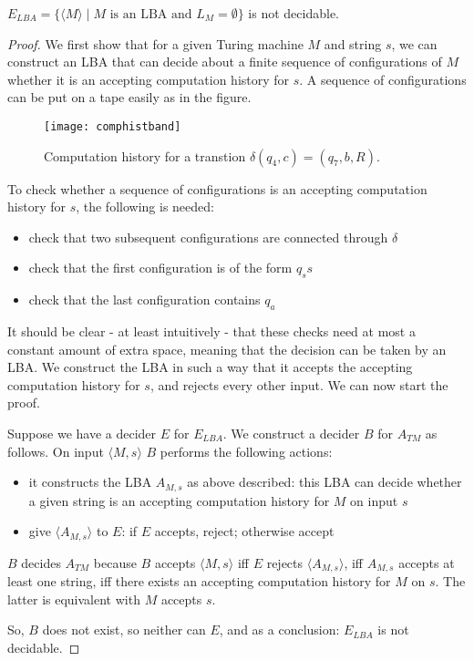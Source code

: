 \begin{theorem}
$E_{LBA} = \{\langle M\rangle \mid \text{$M$ is an LBA and $L_M = \emptyset$}\}$ is not decidable.
\end{theorem}
\begin{proof}
We first show that for a given Turing machine $M$ and string
$s$, we can construct an LBA that can decide about a finite sequence
of configurations of $M$ whether it is an accepting computation
history for $s$. A sequence of configurations can be put on a tape
easily as in the figure.
\begin{figure}
\centering
\texttt{[image: comphistband]}
  \caption{Computation history for a transtion $\delta(q_4,c) = (q_7,b,R)$.}
\end{figure}

To check whether a sequence of configurations is an accepting computation
history for $s$, the following is needed:
\begin{itemize}
\item check that two subsequent configurations are connected through
$\delta$
\item check that the first configuration is of the form $q_ss$
\item check that the last configuration contains $q_a$
\end{itemize}

It should be clear - at least intuitively - that these checks need at
most a constant amount of extra space, meaning that the decision can
be taken by an LBA. We construct the LBA in such a way that it accepts
the accepting computation history for $s$, and rejects every other
input.  We can now start the proof.

Suppose we have a decider $E$ for $E_{LBA}$. We construct a decider
$B$ for $A_{TM}$ as follows. On input $\langle M,s \rangle$ $B$
performs the following actions:
\begin{itemize}
\item it constructs the LBA $A_{M,s}$ as above described: this LBA can
  decide whether a given string is an accepting computation history
  for $M$ on input $s$
\item give $\langle A_{M,s} \rangle$ to $E$: if $E$ accepts, reject;
otherwise accept
\end{itemize}
$B$ decides $A_{TM}$ because $B$ accepts $\langle M,s \rangle$ iff $E$
rejects $\langle A_{M,s} \rangle$, iff $A_{M,s}$ accepts at least one
string, iff there exists an accepting computation history for $M$ on
$s$. The latter is equivalent with $M$ accepts $s$.

So, $B$ does not exist, so neither can $E$, and as a conclusion:
$E_{LBA}$ is not decidable.
\end{proof}

